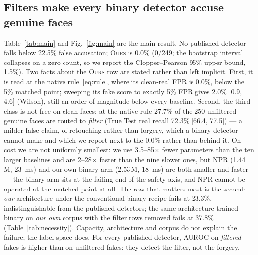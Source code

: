 \documentclass[conference]{IEEEtran}
\newcommand{\ours}{\textsc{Ours}}
\begin{document}
\subsection{Filters make every binary detector accuse genuine faces}
\label{sec:p3}
Table~\ref{tab:main} and Fig.~\ref{fig:main} are the main result. No published detector falls
below 22.5\% false accusation; \ours{} is 0.0\% (0/249; the bootstrap interval collapses on
a zero count, so we report the Clopper--Pearson 95\% upper bound, 1.5\%). Two facts about the
\ours{} row are stated rather than left implicit. First, it is read at the native
rule~\eqref{eq:rule}, where its clean-real FPR is 0.0\%, below the 5\% matched point; sweeping
its fake score to exactly 5\% FPR gives 2.0\% [0.9, 4.6] (Wilson), still an order of magnitude
below every baseline. Second, the third class is not free on clean faces: at the native rule
27.7\% of the 250 unfiltered genuine faces are routed to \emph{filter} (True Test real recall
72.3\% [66.4, 77.5]) --- a milder false claim, of retouching rather than forgery, which a binary
detector cannot make and which we report next to the 0.0\% rather than behind it. On cost we
are not uniformly smallest: we use 3.5--85$\times$ fewer parameters than the ten larger
baselines and are 2--28$\times$ faster than the nine slower ones, but NPR (1.44\,M,
\SI{23}{\milli\second}) and our own binary arm (2.53\,M, \SI{18}{\milli\second}) are both
smaller and faster --- the binary arm sits at the failing end of the safety axis, and NPR
cannot be operated at the matched point at all. The row that matters most is the second:
\emph{our} architecture under the conventional binary recipe fails at 23.3\%, indistinguishable
from the published detectors; the same architecture trained binary on \emph{our own} corpus
with the filter rows removed fails at 37.8\% (Table~\ref{tab:necessity}). Capacity,
architecture and corpus do not explain the failure; the label space does. For every published
detector, AUROC on \emph{filtered} fakes is higher than on unfiltered fakes: they detect the
filter, not the forgery.
\end{document}
